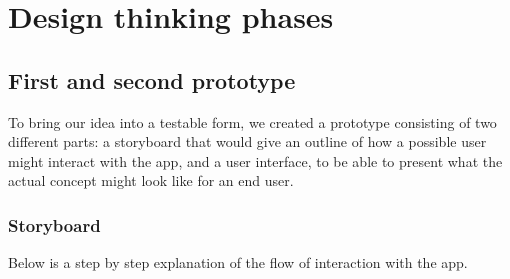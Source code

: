 \section{Design thinking phases}
\label{sec:design-thinking}



\subsection{First and second prototype}

To bring our idea into a testable form, we created a prototype consisting of two different parts: a storyboard that
would give an outline of how a possible user might interact with the app, and a user interface, to be able to present what the actual concept might look like for an end user.

\subsubsection{Storyboard}
Below is a step by step explanation of the flow of interaction with the app.

